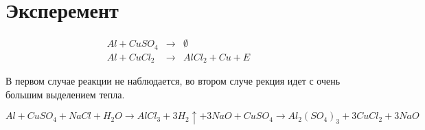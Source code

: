 \section{Эксперемент}

\begin{eqnarray}
    Al + CuSO_4 &\to& \emptyset \\  
    Al + CuCl_2 &\to& AlCl_2  + Cu  + E
\end{eqnarray}

В первом случае реакции не наблюдается, во втором случе рекция идет 
с очень большим выделением тепла.

\begin{equation}
    Al + CuSO_4 + NaCl + H_2O \to 
    AlCl_3 + 3H_2\uparrow + 3NaO + CuSO_4 \to  
    Al_2(SO_4)_3 + 3CuCl_2 + 3NaO
\end{equation}

